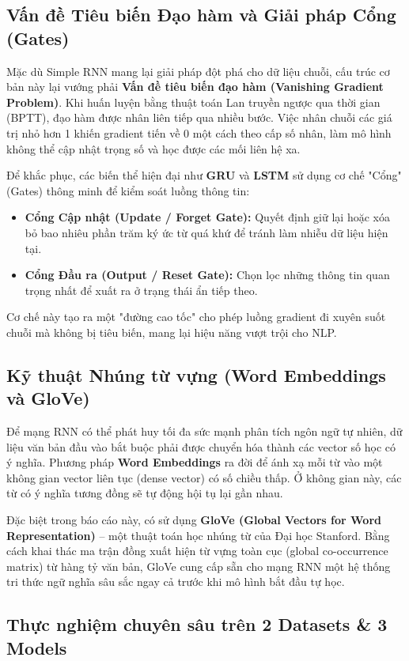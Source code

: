 \subsection{Vấn đề Tiêu biến Đạo hàm và Giải pháp Cổng (Gates)}
Mặc dù Simple RNN mang lại giải pháp đột phá cho dữ liệu chuỗi, cấu trúc cơ bản này lại vướng phải \textbf{Vấn đề tiêu biến đạo hàm (Vanishing Gradient Problem)}. Khi huấn luyện bằng thuật toán Lan truyền ngược qua thời gian (BPTT), đạo hàm được nhân liên tiếp qua nhiều bước. Việc nhân chuỗi các giá trị nhỏ hơn 1 khiến gradient tiến về 0 một cách theo cấp số nhân, làm mô hình không thể cập nhật trọng số và học được các mối liên hệ xa.

Để khắc phục, các biến thể hiện đại như \textbf{GRU} và \textbf{LSTM} sử dụng cơ chế "Cổng" (Gates) thông minh để kiểm soát luồng thông tin:
\begin{itemize}
    \item \textbf{Cổng Cập nhật (Update / Forget Gate):} Quyết định giữ lại hoặc xóa bỏ bao nhiêu phần trăm ký ức từ quá khứ để tránh làm nhiễu dữ liệu hiện tại.
    \item \textbf{Cổng Đầu ra (Output / Reset Gate):} Chọn lọc những thông tin quan trọng nhất để xuất ra ở trạng thái ẩn tiếp theo.
\end{itemize}
Cơ chế này tạo ra một "đường cao tốc" cho phép luồng gradient đi xuyên suốt chuỗi mà không bị tiêu biến, mang lại hiệu năng vượt trội cho NLP.

\subsection{Kỹ thuật Nhúng từ vựng (Word Embeddings và GloVe)}
Để mạng RNN có thể phát huy tối đa sức mạnh phân tích ngôn ngữ tự nhiên, dữ liệu văn bản đầu vào bắt buộc phải được chuyển hóa thành các vector số học có ý nghĩa. Phương pháp \textbf{Word Embeddings} ra đời để ánh xạ mỗi từ vào một không gian vector liên tục (dense vector) có số chiều thấp. Ở không gian này, các từ có ý nghĩa tương đồng sẽ tự động hội tụ lại gần nhau.

Đặc biệt trong báo cáo này, có sử dụng \textbf{GloVe (Global Vectors for Word Representation)} – một thuật toán học nhúng từ của Đại học Stanford. Bằng cách khai thác ma trận đồng xuất hiện từ vựng toàn cục (global co-occurrence matrix) từ hàng tỷ văn bản, GloVe cung cấp sẵn cho mạng RNN một hệ thống tri thức ngữ nghĩa sâu sắc ngay cả trước khi mô hình bắt đầu tự học.
\subsection{Thực nghiệm chuyên sâu trên 2 Datasets \& 3 Models}

